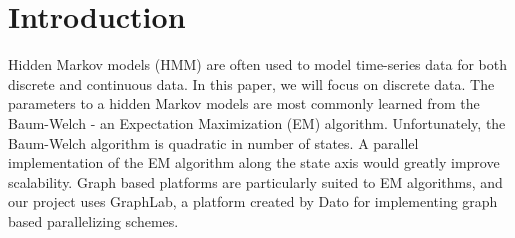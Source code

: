 \section{Introduction}

Hidden Markov models (HMM) are often used to model time-series data for both discrete and continuous data. In this paper, we will focus on discrete data. The parameters to a hidden Markov models are most commonly learned from the Baum-Welch - an Expectation Maximization (EM) algorithm. Unfortunately, the Baum-Welch algorithm is quadratic in number of states. A parallel implementation of the EM algorithm along the state axis would greatly improve scalability. Graph based platforms are particularly suited to EM algorithms, and our project uses GraphLab, a platform created by Dato for implementing graph based parallelizing schemes. 